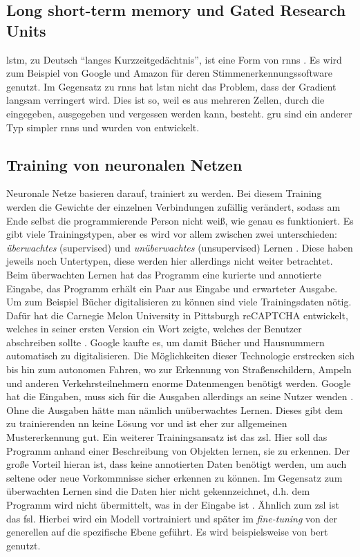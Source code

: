 \subsection[LSTMs und GRUs]{Long short-term memory und Gated Research Units}\label{sub:lstm}
\ac{lstm}, zu Deutsch \enquote{langes Kurzzeitgedächtnis}, ist eine Form von \acp{rnn} \citep{lstm}.
Es wird zum Beispiel von Google und Amazon für deren Stimmenerkennungssoftware genutzt.
Im Gegensatz zu \acp{rnn} hat \ac{lstm} nicht das Problem, dass der Gradient langsam verringert wird.
Dies ist so, weil es aus mehreren Zellen, durch die eingegeben, ausgegeben und vergessen werden kann, besteht.
\ac{gru} sind ein anderer Typ simpler \acp{rnn} und wurden von \citet{gru} entwickelt.

\subsection{Training von neuronalen Netzen}
Neuronale Netze basieren darauf, trainiert zu werden.
Bei diesem Training werden die Gewichte der einzelnen Verbindungen zufällig verändert, sodass am Ende selbst die programmierende Person nicht weiß, wie genau es funktioniert.
Es gibt viele Trainingstypen, aber es wird vor allem zwischen zwei unterschieden: \emph{überwachtes} (supervised) und \emph{unüberwachtes} (unsupervised) Lernen \citep{mllearning}.
Diese haben jeweils noch Untertypen, diese werden hier allerdings nicht weiter betrachtet.
Beim überwachten Lernen hat das Programm eine kurierte und annotierte Eingabe, das Programm erhält ein Paar aus Eingabe und erwarteter Ausgabe.
Um zum Beispiel Bücher digitalisieren zu können sind viele Trainingsdaten nötig.
Dafür hat die Carnegie Melon University in Pittsburgh reCAPTCHA entwickelt, welches in seiner ersten Version ein Wort zeigte, welches der Benutzer abschreiben sollte \citep{recaptchabooks}.
Google kaufte es, um damit Bücher und Hausnummern automatisch zu digitalisieren.
Die Möglichkeiten dieser Technologie erstrecken sich bis hin zum autonomen Fahren, wo zur Erkennung von Straßenschildern, Ampeln und anderen Verkehrsteilnehmern enorme Datenmengen benötigt werden.
Google hat die Eingaben, muss sich für die Ausgaben allerdings an seine Nutzer wenden \citep{recaptchaav}.
Ohne die Ausgaben hätte man nämlich unüberwachtes Lernen.
Dieses gibt dem zu trainierenden \ac{nn} keine Lösung vor und ist eher zur allgemeinen Mustererkennung gut.
Ein weiterer Trainingsansatz ist das \ac{zsl}.
Hier soll das Programm anhand einer Beschreibung von Objekten lernen, sie zu erkennen.
Der große Vorteil hieran ist, dass keine annotierten Daten benötigt werden, um auch seltene oder neue Vorkommnisse sicher erkennen zu können.
Im Gegensatz zum überwachten Lernen sind die Daten hier nicht gekennzeichnet, d.h. dem Programm wird nicht übermittelt, was in der Eingabe ist \citep{zsl}.
Ähnlich zum \ac{zsl} ist das \ac{fsl}.
Hierbei wird ein Modell vortrainiert und später im \emph{fine-tuning} von der generellen auf die spezifische Ebene geführt.
Es wird beispielsweise von \ac{bert} genutzt.

